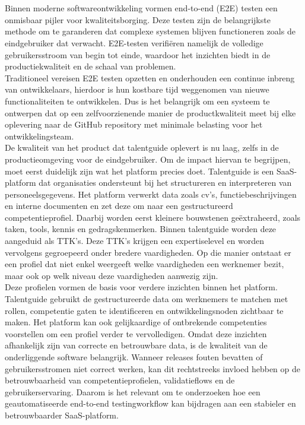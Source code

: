 
\chapter{}%
\label{ch:inleiding}

Binnen moderne softwareontwikkeling vormen end-to-end (E2E) testen een onmisbaar pijler voor kwaliteitsborging. Deze testen zijn de belangrijkste methode om te garanderen dat complexe systemen blijven functioneren zoals de eindgebruiker dat verwacht. E2E-testen verifiëren namelijk de volledige gebruikersstroom van begin tot einde, waardoor het inzichten biedt in de productiekwaliteit en de schaal van problemen.
\bigskip
\\
Traditioneel vereisen E2E testen opzetten en onderhouden een continue inbreng van ontwikkelaars, hierdoor is hun kostbare tijd weggenomen van nieuwe functionaliteiten te ontwikkelen. Dus is het belangrijk om een systeem te ontwerpen dat op een zelfvoorzienende manier de productkwaliteit meet bij elke oplevering naar de GitHub repository met minimale belasting voor het ontwikkelingsteam. 
\bigskip
\\
De kwaliteit van het product dat talentguide oplevert is nu laag, zelfs in de productieomgeving voor de eindgebruiker. Om de impact hiervan te begrijpen, moet eerst duidelijk zijn wat het platform precies doet. Talentguide is een SaaS-platform dat organisaties ondersteunt bij het structureren en interpreteren van personeelsgegevens. Het platform verwerkt data zoals cv’s, functiebeschrijvingen en interne documenten en zet deze om naar een gestructureerd competentieprofiel. Daarbij worden eerst kleinere bouwstenen geëxtraheerd, zoals taken, tools, kennis en gedragskenmerken. Binnen talentguide worden deze aangeduid als TTK’s. Deze TTK’s krijgen een expertiselevel en worden vervolgens gegroepeerd onder bredere vaardigheden. Op die manier ontstaat er een profiel dat niet enkel weergeeft welke vaardigheden een werknemer bezit, maar ook op welk niveau deze vaardigheden aanwezig zijn.
\bigskip
\\
Deze profielen vormen de basis voor verdere inzichten binnen het platform. Talentguide gebruikt de gestructureerde data om werknemers te matchen met rollen, competentie gaten te identificeren en ontwikkelingsnoden zichtbaar te maken. Het platform kan ook gelijkaardige of ontbrekende competenties voorstellen om een profiel verder te vervolledigen. Omdat deze inzichten afhankelijk zijn van correcte en betrouwbare data, is de kwaliteit van de onderliggende software belangrijk. Wanneer releases fouten bevatten of gebruikersstromen niet correct werken, kan dit rechtstreeks invloed hebben op de betrouwbaarheid van competentieprofielen, validatieflows en de gebruikerservaring. Daarom is het relevant om te onderzoeken hoe een geautomatiseerde end-to-end testingworkflow kan bijdragen aan een stabieler en betrouwbaarder SaaS-platform.

